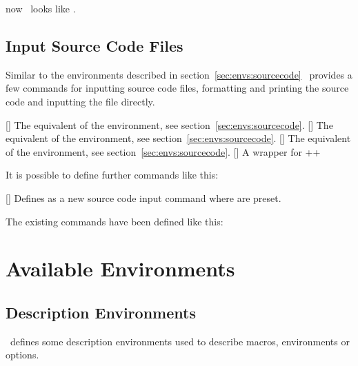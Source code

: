 \documentclass[load-preamble+,babel-options={ngerman,english}]{cnltx-doc}
\begin{document}
\begin{example}
  now \foothree\ looks like \cnltx.
\end{example}

\subsection{Input Source Code Files}
Similar to the environments described in section~\vref{sec:envs:sourcecode}
\cnltxexample\ provides a few commands for inputting source code files,
formatting and printing the source code and inputting the file directly.
\begin{commands}
  []
    The equivalent of the  environment, see
    section~\vref{sec:envs:sourcecode}.
  []
    The equivalent of the  environment, see
    section~\vref{sec:envs:sourcecode}.
  []
    The equivalent of the  environment, see
    section~\vref{sec:envs:sourcecode}.
  []
    A wrapper for
    \verbcode++
\end{commands}

It is possible to define further commands like this:
\begin{commands}
  []
    Defines  as a new source code input command where
     are preset.
\end{commands}

The existing commands have been defined like this:
\begin{sourcecode}
  \newinputsourcefilecmd{}
\end{sourcecode}

\section{Available Environments}\label{sec:envs}
\subsection{Description Environments}\label{sec:envs:description}
\cnltxdoc\ defines some description environments used to describe macros,
environments or options.
\end{document}
